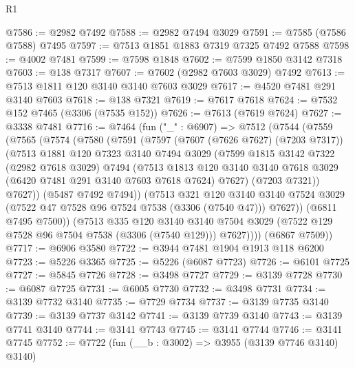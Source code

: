 \begin{lexlean}{R1}
\begin{coremodule}
@7586 := @2982 @7492
@7588 := @2982 @7494 @3029
@7591 := @7585 (@7586 @7588) @7495
@7597 := @7513 @1851 @1883 @7319 @7325 @7492 @7588
@7598 := @4002 @7481
@7599 := @7598 @1848
@7602 := @7599 @1850 @3142 @7318
@7603 := @138 @7317
@7607 := @7602 (@2982 @7603 @3029) @7492
@7613 := @7513 @1811 @120 @3140 @3140 @7603 @3029
@7617 := @4520 @7481 @291 @3140 @7603
@7618 := @138 @7321
@7619 := @7617 @7618
@7624 := @7532 @152 @7465 (@3306 (@7535 @152))
@7626 := @7613 (@7619 @7624)
@7627 := @3338 @7481
@7716 := @7464
    (fun ("_" : @6907) =>
    @7512
      (@7544
        (@7559
          (@7565
            (@7574
              (@7580
                (@7591
                  (@7597
                    (@7607 (@7626 @7627) (@7203 @7317))
                    (@7513
                      @1881
                      @120
                      @7323
                      @3140
                      @7494
                      @3029
                      (@7599
                        @1815
                        @3142
                        @7322
                        (@2982 @7618 @3029)
                        @7494
                        (@7513
                          @1813
                          @120
                          @3140
                          @3140
                          @7618
                          @3029
                          (@6420 @7481 @291 @3140 @7603 @7618 @7624)
                          @7627)
                        (@7203 @7321))
                      @7627))
                  (@5487 @7492 @7494))
                (@7513
                  @321
                  @120
                  @3140
                  @3140
                  @7524
                  @3029
                  (@7522 @47 @7528 @96 @7524 @7538 (@3306 (@7540 @47)))
                  @7627))
              (@6811 @7495 @7500))
            (@7513
              @335
              @120
              @3140
              @3140
              @7504
              @3029
              (@7522 @129 @7528 @96 @7504 @7538 (@3306 (@7540 @129)))
              @7627))))
      (@6867 @7509))
@7717 := @6906 @3580
@7722 := @3944 @7481 @1904 @1913 @118 @6200
@7723 := @5226 @3365
@7725 := @5226 (@6087 @7723)
@7726 := @6101 @7725
@7727 := @5845 @7726
@7728 := @3498 @7727
@7729 := @3139 @7728
@7730 := @6087 @7725
@7731 := @6005 @7730
@7732 := @3498 @7731
@7734 := @3139 @7732 @3140
@7735 := @7729 @7734
@7737 := @3139 @7735 @3140
@7739 := @3139 @7737 @3142
@7741 := @3139 @7739 @3140
@7743 := @3139 @7741 @3140
@7744 := @3141 @7743
@7745 := @3141 @7744
@7746 := @3141 @7745
@7752 := @7722 (fun (__b : @3002) => @3955 (@3139 @7746 @3140) @3140)

\end{coremodule}
\end{lexlean}
